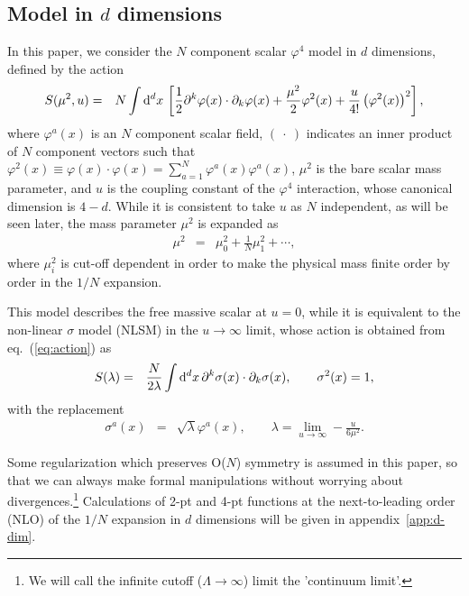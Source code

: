 \documentclass[preprint]{ptephy_v1}%
\newcommand{\rmd}{{\rm d}}
\begin{document}
\subsection{Model in $d$ dimensions}
In this paper, we consider  the  $N$ component scalar $\varphi^4$ model in $d$ dimensions, 
defined by the action
\begin{eqnarray}
S(\mu^2,u) &=&  N \int \rmd^d x\,\left[ \frac{1}{2}\partial^k \varphi (x)\cdot \partial_k \varphi (x) +  \frac{\mu^2}{2}\varphi^2(x) +\frac{u}{4!} \left(\varphi^2(x)\right)^2
\right] ,
\label{eq:action}
\end{eqnarray}
where $\varphi^a(x)$ is an $N$ component scalar field, $(\ \cdot \ )$ 
indicates an inner product of $N$ component vectors such that 
$\varphi^2(x) \equiv \varphi(x)\cdot\varphi(x) =\sum_{a=1}^N \varphi^a(x)\varphi^a(x)$, 
$\mu^2$  is the bare scalar mass parameter, and $u$ is the coupling 
constant of the $\varphi^4$ interaction, whose canonical dimension is $4-d$.
While it is consistent to take $u$ as $N$ independent,
as will be seen later, the mass parameter $\mu^2$ is expanded as
\begin{eqnarray}
\mu^2 &=& \mu_0^2 + \frac{1}{N}\mu_1^2 + \cdots,
\end{eqnarray}
where $\mu_i^2$ is cut-off dependent in order to make the physical mass finite order by order in the  $1/N$ expansion.

This model describes the free massive scalar at $u=0$, while 
it is equivalent to the non-linear $\sigma$ model (NLSM) in the $u\rightarrow \infty$ limit, 
whose action is obtained from eq.~(\ref{eq:action}) as
\begin{eqnarray}
S(\lambda) &=& \frac{ N}{2\lambda} \int \rmd^d x\,\partial^k \sigma (x)\cdot \partial_k \sigma (x) , \qquad
\sigma^2(x) = 1, 
\label{eq:action_NLSM}
\end{eqnarray}
with the replacement
\begin{eqnarray}
\sigma^a(x)&=&\sqrt{\lambda} \varphi^a(x), \qquad \lambda 
=  \lim_{u\rightarrow\infty}  -\frac{u}{6\mu^2} . 
\end{eqnarray}

Some regularization which preserves O($N$) symmetry is assumed in  this paper,
so that we can always make formal manipulations without worrying about divergences.\footnote{We will call the infinite cutoff ($\Lambda\to\infty$) limit the 'continuum limit'.}
Calculations of 2-pt and 4-pt functions at the next-to-leading order (NLO) of the $1/N$ expansion in $d$ dimensions 
will be given in appendix~\ref{app:d-dim}.
\end{document}
